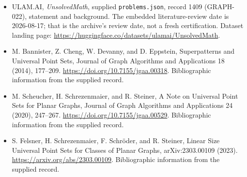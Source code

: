 \documentclass[11pt,a4paper]{article}
\begin{document}
{\small

\begin{itemize}

\item[\hypertarget{source:1409:1}{S1}] ULAM.AI, \emph{UnsolvedMath}, supplied \texttt{problems.json}, record 1409 (GRAPH-022), statement and background. The embedded literature-review date is 2026-08-17; that is the archive’s review date, not a fresh certification. Dataset landing page: \url{https://huggingface.co/datasets/ulamai/UnsolvedMath}.

\item[\hypertarget{source:1409:2}{S2}] M. Bannister, Z. Cheng, W. Devanny, and D. Eppstein, Superpatterns and Universal Point Sets, Journal of Graph Algorithms and Applications 18 (2014), 177–209. \url{https://doi.org/10.7155/jgaa.00318}. Bibliographic information from the supplied record.

\item[\hypertarget{source:1409:3}{S3}] M. Scheucher, H. Schrezenmaier, and R. Steiner, A Note on Universal Point Sets for Planar Graphs, Journal of Graph Algorithms and Applications 24 (2020), 247–267. \url{https://doi.org/10.7155/jgaa.00529}. Bibliographic information from the supplied record.

\item[\hypertarget{source:1409:4}{S4}] S. Felsner, H. Schrezenmaier, F. Schröder, and R. Steiner, Linear Size Universal Point Sets for Classes of Planar Graphs, arXiv:2303.00109 (2023). \url{https://arxiv.org/abs/2303.00109}. Bibliographic information from the supplied record.

\end{itemize}

}

\label{end:1409}
\end{document}
